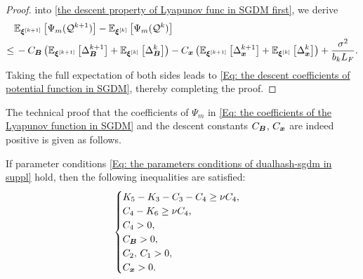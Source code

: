\begin{proof}
    into \eqref{the descent property of Lyapunov func in SGDM first}, we derive
    \begin{align*}
             & \mathbb{E}_{\bm{\xi}^{[k+1]}}\left[\Psi_m(\mathcal{Q}^{k+1})\right] - \mathbb{E}_{\bm{\xi}^{[k]}}\left[\Psi_m(\mathcal{Q}^{k})\right] \nonumber                                                                                                                                                        \\
        \leq & \, -C_{\bm{B}}\left( \mathbb{E}_{\bm{\xi}^{[k+1]}}\left[\Delta_{\bm{B}}^{k+1}\right] + \mathbb{E}_{\bm{\xi}^{[k]}}\left[\Delta_{\bm{B}}^{k}\right] \right) -C_{\bm{x}}\left( \mathbb{E}_{\bm{\xi}^{[k+1]}}\left[\Delta_{\bm{x}}^{k+1}\right]+ \mathbb{E}_{\bm{\xi}^{[k]}}\left[\Delta_{\bm{x}}^{k}\right] \right) + \frac{\sigma^{2}}{b_{k}L_{F}}.
    \end{align*}Taking the full expectation of both sides leads to \eqref{Eq: the descent coefficients of potential function in SGDM},
    thereby completing the proof. 
\end{proof}
The technical proof that the coefficients of $\Psi_m$ in \eqref{Eq: the coefficients of the Lyapunov function in SGDM} and the descent constants $C_{\bm{B}}$, $C_{\bm{x}}$ are indeed positive is given as follows.
\begin{lemma}
    \label{lem:lyapunov-coef-positivity} If parameter conditions \eqref{Eq: the parameters conditions of dualhash-sgdm in suppl}
    hold, then the following inequalities are satisfied:
    \begin{align}
        \begin{cases}K_{5}- K_{3}- C_{3}- C_{4}\geq \nu C_{4}, \\ C_{4}- K_{6}\geq \nu C_{4},\\ C_{4}> 0,\\ C_{\bm{B}}> 0 ,\\ C_{2},\, C_{1}> 0, \\ C_{\bm{x}}> 0.\end{cases} \notag
    \end{align}
\end{lemma}
